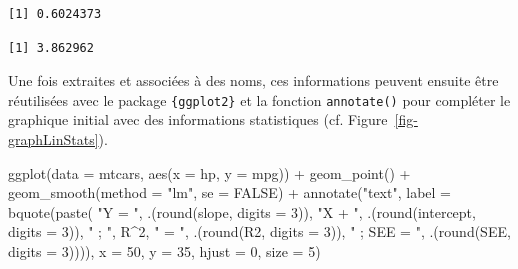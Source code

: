 \documentclass[
  letterpaper,
]{book}
\newenvironment{Shaded}{\begin{snugshade}}{\end{snugshade}}
\newcommand{\AttributeTok}[1]{\textcolor[rgb]{0.40,0.45,0.13}{#1}}
\newcommand{\CommentTok}[1]{\textcolor[rgb]{0.37,0.37,0.37}{#1}}
\newcommand{\ConstantTok}[1]{\textcolor[rgb]{0.56,0.35,0.01}{#1}}
\newcommand{\DecValTok}[1]{\textcolor[rgb]{0.68,0.00,0.00}{#1}}
\newcommand{\FunctionTok}[1]{\textcolor[rgb]{0.28,0.35,0.67}{#1}}
\newcommand{\NormalTok}[1]{\textcolor[rgb]{0.00,0.23,0.31}{#1}}
\newcommand{\OtherTok}[1]{\textcolor[rgb]{0.00,0.23,0.31}{#1}}
\newcommand{\SpecialCharTok}[1]{\textcolor[rgb]{0.37,0.37,0.37}{#1}}
\newcommand{\StringTok}[1]{\textcolor[rgb]{0.13,0.47,0.30}{#1}}
\begin{document}
\begin{verbatim}
[1] 0.6024373
\end{verbatim}

\begin{Shaded}
\end{Shaded}

\begin{verbatim}
[1] 3.862962
\end{verbatim}

Une fois extraites et associées à des noms, ces informations peuvent
ensuite être réutilisées avec le package \texttt{\{ggplot2\}} et la
fonction \texttt{annotate()} pour compléter le graphique initial avec
des informations statistiques (cf. Figure~\ref{fig-graphLinStats}).

\begin{Shaded}
\begin{Highlighting}[]
\FunctionTok{ggplot}\NormalTok{(}\AttributeTok{data =}\NormalTok{ mtcars, }\FunctionTok{aes}\NormalTok{(}\AttributeTok{x =}\NormalTok{ hp, }\AttributeTok{y =}\NormalTok{ mpg)) }\SpecialCharTok{+}
  \FunctionTok{geom\_point}\NormalTok{() }\SpecialCharTok{+}
  \FunctionTok{geom\_smooth}\NormalTok{(}\AttributeTok{method =} \StringTok{"lm"}\NormalTok{, }\AttributeTok{se =} \ConstantTok{FALSE}\NormalTok{) }\SpecialCharTok{+}
  \FunctionTok{annotate}\NormalTok{(}\StringTok{"text"}\NormalTok{, }\AttributeTok{label =} \FunctionTok{bquote}\NormalTok{(}\FunctionTok{paste}\NormalTok{(}
    \StringTok{"Y = "}\NormalTok{, .(}\FunctionTok{round}\NormalTok{(slope, }\AttributeTok{digits =} \DecValTok{3}\NormalTok{)), }\StringTok{"X + "}\NormalTok{, }
\NormalTok{     .(}\FunctionTok{round}\NormalTok{(intercept, }\AttributeTok{digits =} \DecValTok{3}\NormalTok{)), }\StringTok{" ; "}\NormalTok{,}
\NormalTok{     R}\SpecialCharTok{\^{}}\DecValTok{2}\NormalTok{, }\StringTok{" = "}\NormalTok{, .(}\FunctionTok{round}\NormalTok{(R2, }\AttributeTok{digits =} \DecValTok{3}\NormalTok{)), }
     \StringTok{" ; SEE = "}\NormalTok{, .(}\FunctionTok{round}\NormalTok{(SEE, }\AttributeTok{digits =} \DecValTok{3}\NormalTok{)))), }
           \AttributeTok{x =} \DecValTok{50}\NormalTok{, }\AttributeTok{y =} \DecValTok{35}\NormalTok{, }\AttributeTok{hjust =} \DecValTok{0}\NormalTok{, }\AttributeTok{size =} \DecValTok{5}\NormalTok{)}
\end{Highlighting}
\end{Shaded}
\end{document}
